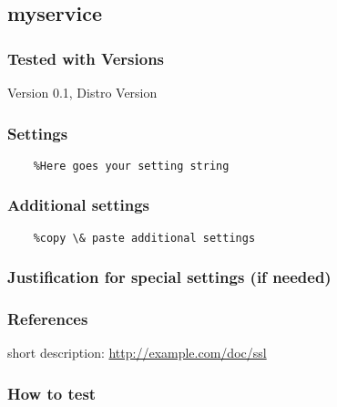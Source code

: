 \subsection{myservice}


\subsubsection{Tested with Versions}
\begin{itemize*}
  \item Version 0.1, Distro Version
\end{itemize*}

\subsubsection{Settings}

\begin{lstlisting}
    %Here goes your setting string
\end{lstlisting}

\subsubsection{Additional settings}


\begin{lstlisting}
    %copy \& paste additional settings
\end{lstlisting}

\subsubsection{Justification for special settings (if needed)}


\subsubsection{References}
\begin{itemize*}
  \item short description: \url{http://example.com/doc/ssl}
\end{itemize*}


\subsubsection{How to test}

